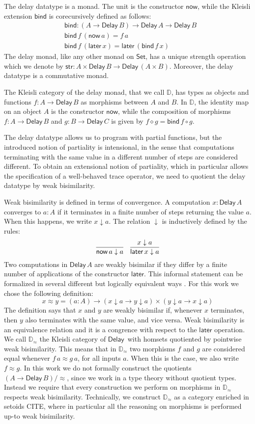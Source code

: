 \documentclass[runningheads]{llncs}
\newcommand{\Set}{\mathsf{Set}}
\newcommand{\comp}{\circ}
\newcommand{\Delay}{\mathsf{Delay}\,}
\newcommand{\now}{\mathsf{now}}
\newcommand{\later}{\mathsf{later}}
\newcommand{\dn}{\downarrow}
\newcommand{\bind}{\mathsf{bind}}
\newcommand{\str}{\mathsf{str}}
\newcommand{\D}{\mathbb{D}}
\newcommand{\Dapprox}{\mathbb{D}_{\approx}}
\begin{document}
The delay datatype is a monad. The unit is the constructor $\now$,
while the Kleisli extension $\bind$ is corecursively defined as follows:
\begin{align*}
& \bind : (A \to \Delay B) \to \Delay A \to \Delay B \\
& \bind \,f \, (\now\,a) = f\,a \\
& \bind\,f\,(\later\,x) = \later\,(\bind\,f\,x)
\end{align*}
The delay monad, like any other monad on $\Set$, has a unique strength
operation which we denote by $\str : A \times \Delay B \to \Delay (A
\times B)$. Moreover, the delay datatype is a commutative monad.

The Kleisli category of the delay monad, that we call $\D$, has types
as objects and functions $f : A \to \Delay B$ as morphisms between $A$
and $B$. In $\D$, the identity map on an object $A$ is the constructor
$\now$, while the composition of morphisms $f : A \to \Delay B$ and $g
: B \to \Delay C$ is given by $f \diamond g = \bind\,f \comp g$.

The delay datatype allows us to program with partial functions, but
the introduced notion of partiality is intensional, in the sense that
computations terminating with the same value in a different number of
steps are considered different. To obtain an extensional notion of
partiality, which in particular allows the specification of a
well-behaved trace operator, we need to quotient the delay datatype by
weak bisimilarity.

Weak bisimilarity is defined in terms of convergence. A computation
$x : \Delay A$ converges to $a : A$ if it terminates in a finite
number of steps returning the value $a$. When this happens, we write
$x \dn a$. The relation $\dn$ is inductively defined by the rules:
\[
\infer{\now\,a \dn a}{}
\quad
\infer{\later\,x \dn a}{x \dn a}
\]
Two computations in $\Delay A$ are weakly bisimilar if they differ by
a finite number of applications of the constructor $\later$. This
informal statement can be formalized in several different but
logically equivalent ways \cite{ChapmanUV19}. For this work we chose the
following definition:
\[
x \approx y = (a : A) \to (x \dn a \to y \dn a) \times (y \dn a \to x \dn a) 
\]
The definition says that $x$ and $y$ are weakly bisimilar if, whenever
$x$ terminates, then $y$ also terminates with the same value, and vice
versa. Weak bisimilarity is an equivalence relation and it is a
congrence with respect to the $\later$ operation.  We call $\Dapprox$
the Kleisli category of $\Delay$ with homsets quotiented by pointwise
weak bisimilarity. This means that in $\Dapprox$ two morphisms $f$ and
$g$ are considered equal whenever $f \, a \approx g \, a$, for all
inputs $a$. When this is the case, we also write $f \approx g$.  In
this work we do not formally construct the quotients
$(A \to \Delay B)/{\approx}$, since we work in a type theory without
quotient types. Instead we require that every construction we perform
on morphisms in $\Dapprox$ respects weak bisimilarity. Technically, we
construct $\Dapprox$ as a category enriched in setoids CITE, where in
particular all the reasoning on morphisms is performed up-to weak
bisimilarity.
\end{document}
